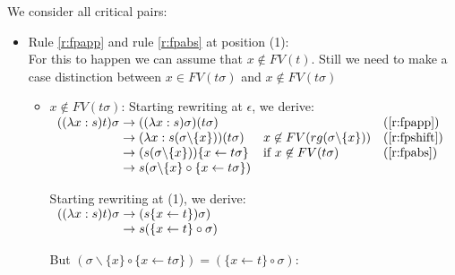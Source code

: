 \documentclass[a4paper]{article}
\newcommand{\fpsubstin}[1]{\{#1\}}
\newcommand{\fpscat}[0]{\circ}
\newcommand{\fpwith}{\leftarrow}
\newcommand{\fpwithoutset}[1]{\backslash\{#1\}}
\newcommand{\rewrites}[0]{\;\rightarrow\;}
\begin{document}
We consider all critical pairs:
\begin{itemize}
\item Rule \ref{r:fpapp} and rule \ref{r:fpabs} at position (1):\\
  For this to happen we can assume that $x \not \in FV(t)$. Still we need to
  make a case distinction between $x \in FV(t\sigma)$ and $x \not \in FV(t\sigma)$\\

  \begin{itemize}
  \item $x \not \in FV(t\sigma)$: Starting rewriting at $\epsilon$, we derive:\\
    $
    \begin{array}{r@{\rewrites}lll}
      ((\lambda x:s)t)\sigma & ((\lambda x:s)\sigma)(t\sigma) & & (\ref{r:fpapp})\\
                             & (\lambda x : s(\sigma\fpwithoutset{x}))
                               (t\sigma) & x \not\in FV(rg(\sigma\fpwithoutset{x}))
                                                                & (\ref{r:fpshift})\\
                             & (s(\sigma\fpwithoutset{x}))\fpsubstin{
                               x \fpwith t\sigma} &  \mbox{if }x \not
                                                    \in FV(t\sigma) & (\ref{r:fpabs})\\
                             & s(\sigma\fpwithoutset{x} \fpscat
                               \fpsubstin{x \fpwith t\sigma}) & \\
    \end{array}
    $

    Starting rewriting at (1), we derive:\\

    $
    \begin{array}{r@{\rewrites}l}
      ((\lambda x:s)t)\sigma & (s\fpsubstin{x \fpwith t})\sigma ) \\
                             & s(\fpsubstin{x \fpwith t} \fpscat \sigma ) \\
    \end{array}
    $

    But $(\sigma\fpwithoutset{x} \fpscat \fpsubstin{x \fpwith t\sigma}) =
    (\fpsubstin{x \fpwith t} \fpscat \sigma)$:


\end{itemize}
\end{itemize}
\end{document}
